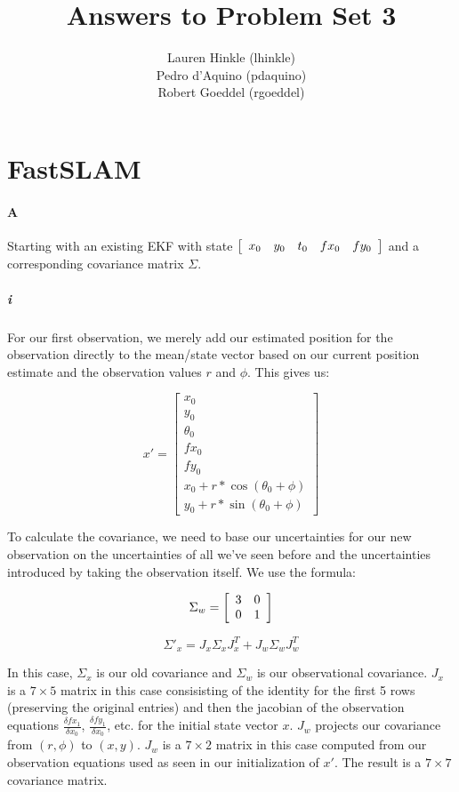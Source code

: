 \documentclass[12pt]{article}
\title{Answers to Problem Set 3}
\author{
	Lauren Hinkle (lhinkle)\\
	Pedro d'Aquino (pdaquino)\\
	Robert Goeddel (rgoeddel)}
\begin{document}
\maketitle
\pagebreak

\section{FastSLAM}

\paragraph{A}
Starting with an existing EKF with state $\left[\begin{array}{c c c c c}x_0 & y_0 & t_0 & fx_0 & fy_0\end{array}\right]$ and a corresponding covariance matrix $\Sigma$.
\subparagraph{i}
For our first observation, we merely add our estimated position for the observation
directly to the mean/state vector based on our current position estimate and the
observation values $r$ and $\phi$. This gives us:

$$x' = \left[\begin{array}{c}x_0 \\
        y_0 \\
        \theta_0 \\
        fx_0 \\
        fy_0 \\
        x_0 + r * \cos (\theta_0 + \phi) \\
        y_0 + r * \sin (\theta_0 + \phi)
        \end{array}\right]
$$

To calculate the covariance, we need to base our uncertainties for our new observation
on the uncertainties of all we've seen before and the uncertainties introduced by taking
the observation itself. We use the formula:

$$\Sigma_w = \left[\begin{array}{c c}
    3 & 0 \\
    0 & 1 \end{array}\right]
$$

$$\Sigma'_x = J_x \Sigma_x J_x^T + J_w \Sigma_w J_w^T$$

In this case, $\Sigma_x$ is our old covariance and $\Sigma_w$ is our observational covariance.
$J_x$ is a $7 \times 5$ matrix in this case consisisting of the identity for the first 5 rows (preserving
the original entries) and then the jacobian of the observation equations $\frac{\delta fx_1}{\delta x_0}$,
$\frac{\delta fy_1}{\delta x_0}$, etc. for the initial state vector $x$. $J_w$ projects our covariance
from $(r,\phi)$ to $(x,y)$. $J_w$ is a $7 \times 2$ matrix in this case computed from our observation equations
used as seen in our initialization of $x'$. The result is a $7 \times 7$ covariance matrix.
\end{document}
